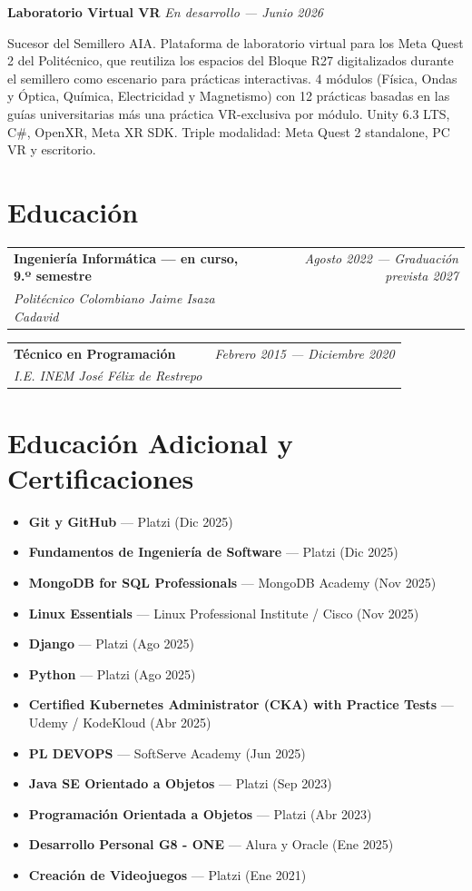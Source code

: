 \documentclass[11pt, a4paper]{article}
\makeatletter
\newcommand{\eduentry}[4]{%
  \noindent
  \begin{tabularx}{\textwidth}{@{}X r@{}}
    \textbf{#1} & \textit{\small\color{darkgray}#3 — #4} \\
    \textit{\color{darkgray}#2} & \\
  \end{tabularx}%
}
\makeatother
\begin{document}
\vspace{6pt}
\noindent\textbf{\color{primary}Laboratorio Virtual VR} \hfill
\textit{\small\color{darkgray}En desarrollo — Junio 2026}

Sucesor del Semillero AIA. Plataforma de laboratorio
virtual para los Meta Quest 2 del Politécnico, que reutiliza los espacios del Bloque R27
digitalizados durante el semillero como escenario para prácticas interactivas. 4 módulos
(Física, Ondas y Óptica, Química, Electricidad y Magnetismo) con 12 prácticas basadas
en las guías universitarias más una práctica VR-exclusiva por módulo. Unity 6.3 LTS,
C\#, OpenXR, Meta XR SDK. Triple modalidad: Meta Quest 2 standalone, PC VR y escritorio.

\section{Educación}

\eduentry{Ingeniería Informática \textmd{--- en curso, 9.º semestre}}{Politécnico Colombiano Jaime Isaza Cadavid}{Agosto 2022}{Graduación prevista 2027}

\vspace{4pt}
\eduentry{Técnico en Programación}{I.E. INEM José Félix de Restrepo}{Febrero 2015}{Diciembre 2020}

\section{Educación Adicional y Certificaciones}

\begin{itemize}[itemsep=1pt]
  \item \textbf{Git y GitHub} — Platzi (Dic 2025)
  \item \textbf{Fundamentos de Ingeniería de Software} — Platzi (Dic 2025)
  \item \textbf{MongoDB for SQL Professionals} — MongoDB Academy (Nov 2025)
  \item \textbf{Linux Essentials} — Linux Professional Institute / Cisco (Nov 2025)
  \item \textbf{Django} — Platzi (Ago 2025)
  \item \textbf{Python} — Platzi (Ago 2025)
  \item \textbf{Certified Kubernetes Administrator (CKA) with Practice Tests} — Udemy / KodeKloud (Abr 2025)
  \item \textbf{PL DEVOPS} — SoftServe Academy (Jun 2025)
  \item \textbf{Java SE Orientado a Objetos} — Platzi (Sep 2023)
  \item \textbf{Programación Orientada a Objetos} — Platzi (Abr 2023)
  \item \textbf{Desarrollo Personal G8 - ONE} — Alura y Oracle (Ene 2025)
  \item \textbf{Creación de Videojuegos} — Platzi (Ene 2021)
\end{itemize}
\end{document}
